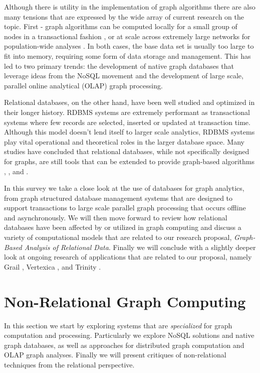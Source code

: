 \documentclass[11pt,letterpaper]{article}
\begin{document}
Although there is utility in the implementation of graph algorithms there are also many tensions that are expressed by the wide array of current research on the topic. First - graph algorithms can be computed locally for a small group of nodes in a transactional fashion \cite{jadhav_comparative_2014}, or at scale across extremely large networks for population-wide analyses \cite{cuzzocrea_big_2014}. In both cases, the base data set is usually too large to fit into memory, requiring some form of data storage and management. This has led to two primary trends: the development of native graph databases that leverage ideas from the NoSQL movement and the development of large scale, parallel online analytical (OLAP) graph processing.

Relational databases, on the other hand, have been well studied and optimized in their longer history. RDBMS systems are extremely performant as transactional systems where few records are selected, inserted or updated at transaction time. Although this model doesn't lend itself to larger scale analytics, RDBMS systems play vital operational and theoretical roles in the larger database space. Many studies have concluded that relational databases, while not specifically designed for graphs, are still tools that can be extended to provide graph-based algorithms \cite{welc_graph_2013}, \cite{najork_hammers_2012}, and \cite{vicknair_comparison_2010}.

In this survey we take a close look at the use of databases for graph analytics, from graph structured database management systems that are designed to support transactions to large scale parallel graph processing that occurs offline and asynchronously. We will then move forward to review how relational databases have been affected by or utilized in graph computing and discuss a variety of computational models that are related to our research proposal, \textit{Graph-Based Analysis of Relational Data}. Finally we will conclude with a slightly deeper look at ongoing research of applications that are related to our proposal, namely Grail \cite{fan_case_2015}, Vertexica \cite{jindal_vertexica:_2014}, and Trinity \cite{shao_trinity:_2013}.

\section*{Non-Relational Graph Computing}

In this section we start by exploring systems that are \textit{specialized} for graph computation and processing. Particularly we explore NoSQL solutions and native graph databases, as well as approaches for distributed graph computation and OLAP graph analyses. Finally we will present critiques of non-relational techniques from the relational perspective.
\end{document}

